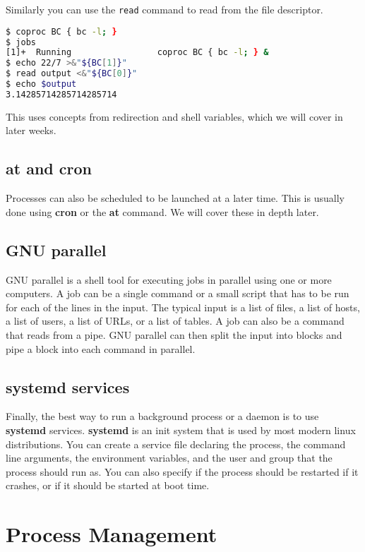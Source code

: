 Similarly you can use the \texttt{read} command to read from the file descriptor.

\begin{lstlisting}[language=bash]
$ coproc BC { bc -l; }
$ jobs
[1]+  Running                 coproc BC { bc -l; } &
$ echo 22/7 >&"${BC[1]}"
$ read output <&"${BC[0]}"
$ echo $output
3.14285714285714285714
\end{lstlisting}

This uses concepts from redirection and shell variables, which we will cover
in later weeks.

\subsection{at and cron}

Processes can also be scheduled to be launched at a later time.
This is usually done using \textbf{cron} or the \textbf{at} command.
We will cover these in depth later.

\subsection{GNU parallel}

GNU parallel is a shell tool for executing jobs in parallel using one
or more computers. A job can be a single command or a small script that
has to be run for each of the lines in the input. The typical input is
a list of files, a list of hosts, a list of users, a list of URLs, or a
list of tables. A job can also be a command that reads from a pipe.
GNU parallel can then split the input into blocks and pipe a block
into each command in parallel.

\subsection{systemd services}

Finally, the best way to run a background process or a daemon is to use
\textbf{systemd} services. \textbf{systemd} is an init system that is
used by most modern linux distributions. You can create a service file
declaring the process, the command line arguments, the environment variables,
and the user and group that the process should run as. You can also
specify if the process should be restarted if it crashes, or if it should
be started at boot time.


\vfill
\pagebreak
\section{Process Management}
